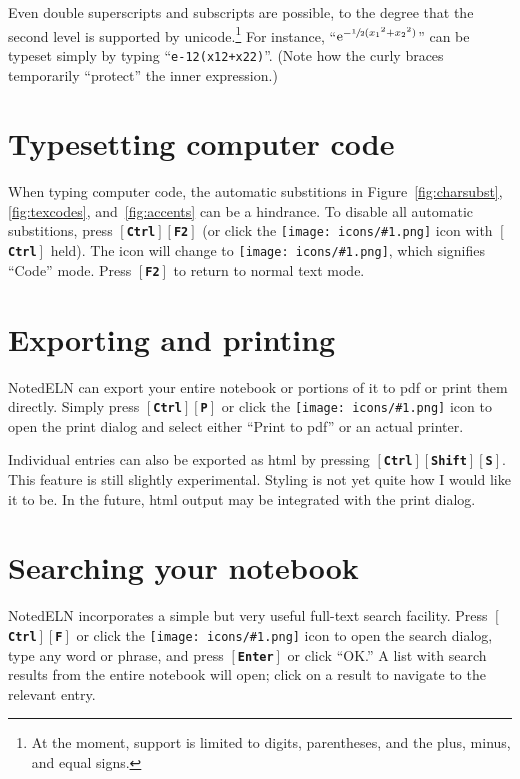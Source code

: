 \documentclass[11pt]{report}
\def\keystroke#1{$\left[\right.\!${\tt\bfseries #1}$\!\left.\right]$}
\def\key#1{\keystroke{#1}}
\def\keycombo#1#2{\keystroke{#1}\keystroke{#2}}
\def\keycontrol#1{\keycombo{Ctrl}{#1}}
\def\controlshift#1{\keystroke{Ctrl}\keystroke{Shift}\keystroke{#1}}
\def\icon#1{\raise-2pt\hbox{\texttt{[image: icons/\#1.png]}}}
\begin{document}
Even double superscripts and subscripts are possible,
to the degree that the second level is supported by
unicode.\footnote{At the moment, support is limited to digits,
  parentheses, and the plus, minus, and equal signs.} For
instance, ``$\mathrm{e}^{-\sfrac12(x_1{}^2+x_2{}^2)}$'' can be typeset simply by
typing
``{\tt{e-12(x12+x22)}}''. (Note
how the curly braces temporarily ``protect'' the inner expression.)

\section{Typesetting computer code}\label{sec:codemode}

When typing computer code, the automatic substitions in
Figure~\ref{fig:charsubst}, \ref{fig:texcodes}, and~\ref{fig:accents} can be a
hindrance. To disable all automatic substitions, press \keycontrol{F2}
(or click the \icon{type} icon with \key{Ctrl} held). The icon will
change to \icon{type-code}, which signifies ``Code'' mode. Press
\key{F2} to return to normal text mode.

\section{Exporting and printing}

NotedELN can export your entire notebook or portions of it to pdf or print
them directly. Simply press \keycontrol{P} or click the
\icon{nav-print} icon
to open the print dialog and select either ``Print to pdf'' or an
actual printer.

Individual entries can also be exported as html by pressing
\controlshift{S}. This feature is still slightly experimental. Styling
is not yet quite how I would like it to be. In the future, html output
may be integrated with the print dialog. 

\section{Searching your notebook}

NotedELN incorporates a simple but very useful full-text search
facility. Press \keycontrol{F} or click the \icon{nav-find} icon to open the
search dialog, type any word or phrase, and press \key{Enter} or click
``OK.'' A list with search results from the entire notebook will open;
click on a result to navigate to the relevant entry.
\end{document}
